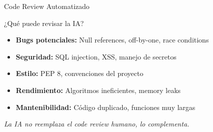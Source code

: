 \documentclass[aspectratio=169]{beamer}
\begin{document}
\begin{frame}{Code Review Automatizado}
    \begin{block}{¿Qué puede revisar la IA?}
        \begin{itemize}
            \item \textbf{Bugs potenciales:} Null references, off-by-one, race conditions
            \item \textbf{Seguridad:} SQL injection, XSS, manejo de secretos
            \item \textbf{Estilo:} PEP 8, convenciones del proyecto
            \item \textbf{Rendimiento:} Algoritmos ineficientes, memory leaks
            \item \textbf{Mantenibilidad:} Código duplicado, funciones muy largas
        \end{itemize}
    \end{block}
    
    \vspace{0.3cm}
    \centering
    \textit{La IA no reemplaza el code review humano, lo complementa.}
\end{frame}
\end{document}
